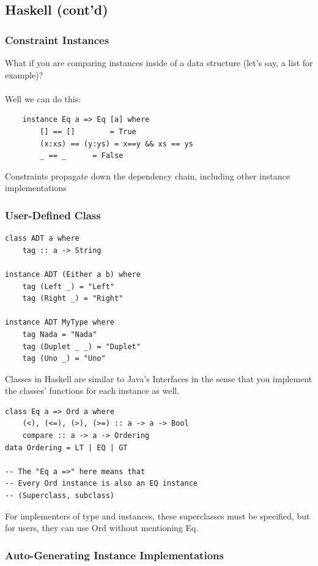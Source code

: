 \documentclass[12pt]{article}
\begin{document}
\subsection{Haskell (cont'd)}

\subsubsection{Constraint Instances}

What if you are comparing instances inside of a data structure (let's say, a list for example)?\\
\\
Well we can do this:

\begin{lstlisting}
	instance Eq a => Eq [a] where
		[] == []		= True
		(x:xs) == (y:ys) = x==y && xs == ys
		_ == _		= False
\end{lstlisting}

Constraints propagate down the dependency chain, including other instance implementations

\subsubsection{User-Defined Class}

\begin{lstlisting}
class ADT a where
	tag :: a -> String
	
instance ADT (Either a b) where
	tag (Left _) = "Left"
	tag (Right _) = "Right"
	
instance ADT MyType where
	tag Nada = "Nada"
	tag (Duplet _ _) = "Duplet"
	tag (Uno _) = "Uno"
\end{lstlisting}

Classes in Haskell are similar to Java's Interfaces in the sense that you implement the classes' functions for each instance as well.

\begin{lstlisting}
class Eq a => Ord a where
	(<), (<=), (>), (>=) :: a -> a -> Bool
	compare :: a -> a -> Ordering
data Ordering = LT | EQ | GT

-- The "Eq a =>" here means that
-- Every Ord instance is also an EQ instance
-- (Superclass, subclass)
\end{lstlisting}

For implementers of type and instances, these superclasses must be specified, but for users, they can use Ord without mentioning Eq.

\subsubsection{Auto-Generating Instance Implementations}
\end{document}
